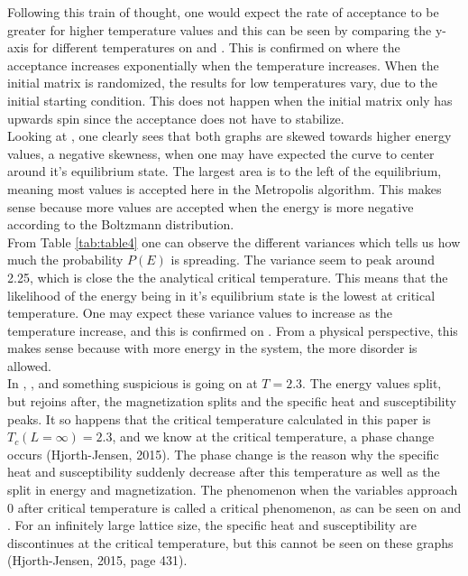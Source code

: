\documentclass[10pt,a4paper]{article}
\begin{document}
\noindent Following this train of thought, one would expect the rate of acceptance to be greater for higher temperature values and this can be seen by comparing the y-axis for different temperatures on  and . This is confirmed on  where the acceptance increases exponentially when the temperature increases. When the initial matrix is randomized, the results for low temperatures vary, due to the initial starting condition. This does not happen when the initial matrix only has upwards spin since the acceptance does not have to stabilize.\\

\noindent Looking at , one clearly sees that both graphs are skewed towards higher energy values, a negative skewness, when one may have expected the curve to center around it's equilibrium state. The largest area is to the left of the equilibrium, meaning most values is accepted here in the Metropolis algorithm. This makes sense because more values are accepted when the energy is more negative according to the Boltzmann distribution.\\

\noindent From Table \ref{tab:table4} one can observe the different variances which tells us how much the probability $P(E)$ is spreading. The variance seem to peak around 2.25, which is close the the analytical critical temperature. This means that the likelihood of the energy being in it's equilibrium state is the lowest at critical temperature. One may expect these variance values to increase as the temperature increase, and this is confirmed on . From a physical perspective, this makes sense because with more energy in the system, the more disorder is allowed.\\

\noindent In , ,  and  something suspicious is going on at $T = 2.3$. The energy values split, but rejoins after, the magnetization splits and the specific heat and susceptibility peaks. It so happens that the critical temperature calculated in this paper is $T_c(L = \infty) = 2.3$, and we know at the critical temperature, a phase change occurs (Hjorth-Jensen, 2015). The phase change is the reason why the specific heat and susceptibility suddenly decrease after this temperature as well as the split in energy and magnetization. The phenomenon when the variables approach $0$ after critical temperature is called a critical phenomenon, as can be seen on  and . For an infinitely large lattice size, the specific heat and susceptibility are discontinues at the critical temperature, but this cannot be seen on these graphs (Hjorth-Jensen, 2015, page 431).\\
\end{document}
